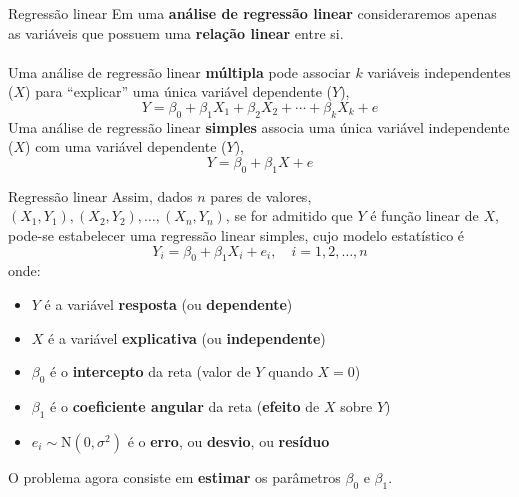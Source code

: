 \documentclass[10pt]{beamer}\usepackage[]{graphicx}\usepackage[]{color}
\theoremstyle{definition}
\begin{document}
\begin{frame}[fragile]{Regressão linear}
  Em uma \textbf{análise de regressão linear} consideraremos apenas as
  variáveis que possuem uma \textbf{relação linear} entre si. \\~\\
  Uma análise de regressão linear \textbf{múltipla} pode associar $k$
  variáveis independentes ($X$) para ``explicar'' uma única variável
  dependente ($Y$),
  \begin{equation*}
    Y = \beta_0 + \beta_1 X_1 + \beta_2 X_2 + \cdots + \beta_k X_k + e
  \end{equation*}
  Uma análise de regressão linear \textbf{simples} associa uma única
  variável independente ($X$) com uma variável dependente ($Y$),
  \begin{equation*}
    Y = \beta_0 + \beta_1 X + e
  \end{equation*}
\end{frame}

\begin{frame}[fragile]{Regressão linear}
  Assim, dados $n$ pares de valores, $(X_1, Y_1), (X_2, Y_2), \ldots,
  (X_n, Y_n)$, se for admitido que $Y$ é função linear de $X$, pode-se
  estabelecer uma regressão linear simples, cujo modelo estatístico é
  \begin{equation*}
    Y_i = \beta_0 + \beta_1 X_i + e_i, \quad i = 1, 2, \ldots, n
  \end{equation*}
  onde:
  \begin{itemize}
  \item $Y$ é a variável \textbf{resposta} (ou \textbf{dependente})
  \item $X$ é a variável \textbf{explicativa} (ou \textbf{independente})
  \item $\beta_0$ é o \textbf{intercepto} da reta (valor de $Y$ quando
    $X = 0$)
  \item $\beta_1$ é o \textbf{coeficiente angular} da reta
    (\textbf{efeito} de $X$ sobre $Y$)
  \item $e_i \sim \text{N}(0, \sigma^2)$ é o \textbf{erro}, ou
    \textbf{desvio}, ou \textbf{resíduo}
  \end{itemize}
  O problema agora consiste em \textbf{estimar} os parâmetros $\beta_0$
  e $\beta_1$. \\~\\
\end{frame}
\end{document}
